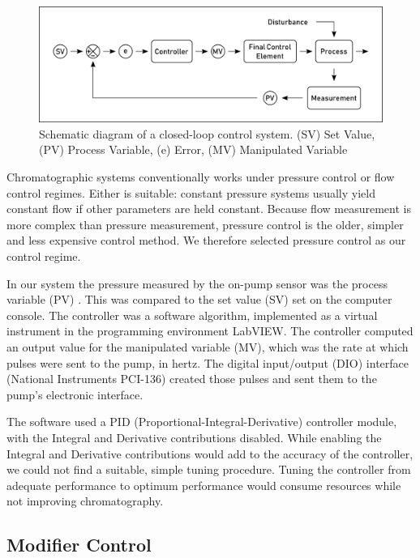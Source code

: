 \begin{figure}
\centering
\includegraphics[width=\textwidth]{Figures/ProcessControl.pdf}
\decoRule

\caption[A process control system]{Schematic diagram of a closed-loop control
system. (SV) Set Value, (PV) Process Variable, (e) Error, (MV) Manipulated
Variable}

\label{fig:processcontrol}
\end{figure}

Chromatographic systems conventionally works under pressure control or flow
control regimes. Either is suitable: constant pressure systems usually yield
constant flow if other parameters are held constant. Because flow measurement is
more complex than pressure measurement, pressure control is the older, simpler
and less expensive control method. We therefore selected pressure control as our
control regime.

In our system the pressure measured by the on-pump sensor was the process
variable (PV) . This was compared to the set value (SV) set on the computer
console. The controller was a software algorithm, implemented as a virtual
instrument in the programming environment LabVIEW. The controller computed an
output value for the manipulated variable (MV), which was the rate at which
pulses were sent to the pump, in hertz. The digital input/output (DIO) interface (National Instruments PCI-136)
created those pulses and sent them to the pump's electronic interface.

The software used a PID (Proportional-Integral-Derivative) controller module,
with the Integral and Derivative contributions disabled. While enabling the
Integral and Derivative contributions would add to the accuracy of the
controller, we could not find a suitable, simple tuning procedure. Tuning the
controller from adequate performance to optimum performance would consume
resources while not improving chromatography.

\subsection{Modifier Control}

